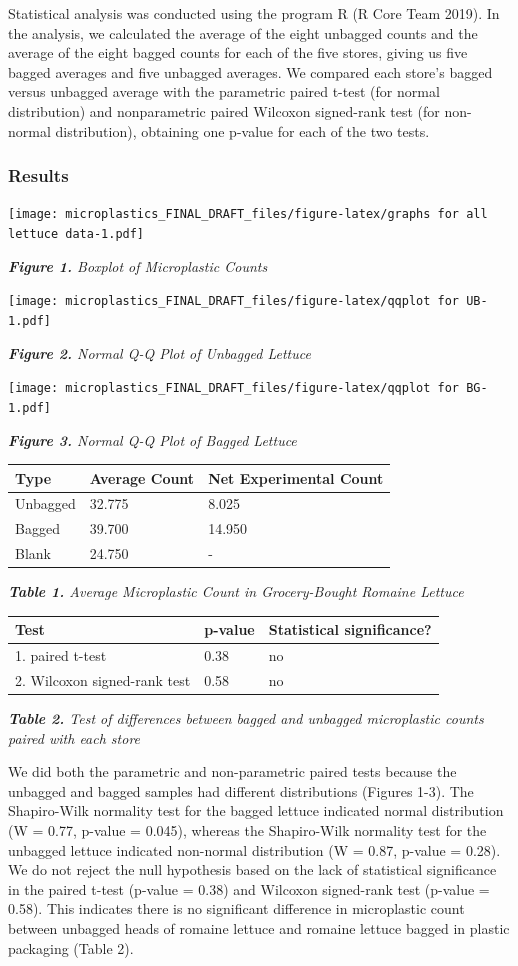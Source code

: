 \documentclass[]{article}
\begin{document}
Statistical analysis was conducted using the program R (R Core Team
2019). In the analysis, we calculated the average of the eight unbagged
counts and the average of the eight bagged counts for each of the five
stores, giving us five bagged averages and five unbagged averages. We
compared each store's bagged versus unbagged average with the parametric
paired t-test (for normal distribution) and nonparametric paired
Wilcoxon signed-rank test (for non-normal distribution), obtaining one
p-value for each of the two tests.

\hypertarget{results}{%
\subsubsection{Results}\label{results}}

\texttt{[image: microplastics\_FINAL\_DRAFT\_files/figure-latex/graphs for all lettuce data-1.pdf]}

\emph{\textbf{Figure 1.} Boxplot of Microplastic Counts}

\texttt{[image: microplastics\_FINAL\_DRAFT\_files/figure-latex/qqplot for UB-1.pdf]}

\emph{\textbf{Figure 2.} Normal Q-Q Plot of Unbagged Lettuce}

\texttt{[image: microplastics\_FINAL\_DRAFT\_files/figure-latex/qqplot for BG-1.pdf]}

\emph{\textbf{Figure 3.} Normal Q-Q Plot of Bagged Lettuce}

\begin{longtable}[]{@{}lll@{}}
\toprule
Type & Average Count & Net Experimental Count\tabularnewline
\midrule
\endhead
Unbagged & 32.775 & 8.025\tabularnewline
Bagged & 39.700 & 14.950\tabularnewline
Blank & 24.750 & -\tabularnewline
\bottomrule
\end{longtable}

\emph{\textbf{Table 1.} Average Microplastic Count in Grocery-Bought
Romaine Lettuce}

\begin{longtable}[]{@{}lll@{}}
\toprule
Test & p-value & Statistical significance?\tabularnewline
\midrule
\endhead
1. paired t-test & 0.38 & no\tabularnewline
2. Wilcoxon signed-rank test & 0.58 & no\tabularnewline
\bottomrule
\end{longtable}

\emph{\textbf{Table 2.} Test of differences between bagged and unbagged
microplastic counts paired with each store}

We did both the parametric and non-parametric paired tests because the
unbagged and bagged samples had different distributions (Figures 1-3).
The Shapiro-Wilk normality test for the bagged lettuce indicated normal
distribution (W = 0.77, p-value = 0.045), whereas the Shapiro-Wilk
normality test for the unbagged lettuce indicated non-normal
distribution (W = 0.87, p-value = 0.28). We do not reject the null
hypothesis based on the lack of statistical significance in the paired
t-test (p-value = 0.38) and Wilcoxon signed-rank test (p-value = 0.58).
This indicates there is no significant difference in microplastic count
between unbagged heads of romaine lettuce and romaine lettuce bagged in
plastic packaging (Table 2).
\end{document}
